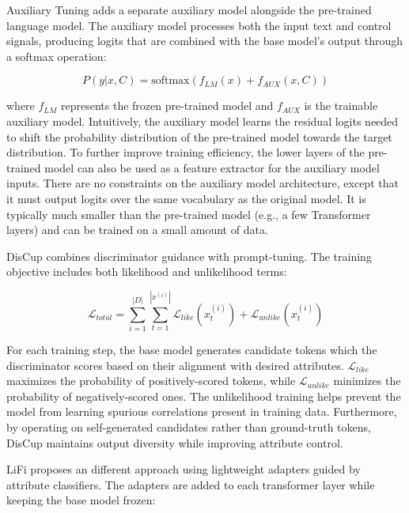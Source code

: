 Auxiliary Tuning \cite{zeldes2020technicalreportauxiliarytuning} adds a separate auxiliary model alongside the pre-trained language model. 
The auxiliary model processes both the input text and control signals, producing logits that are combined with the base model's output through a softmax operation:

\begin{equation}
    P(y|x,C) = \text{softmax}(f_{LM}(x) + f_{AUX}(x,C))
\end{equation}

where $f_{LM}$ represents the frozen pre-trained model and $f_{AUX}$ is the trainable auxiliary model. 
Intuitively, the auxiliary model learns the residual logits needed to shift the probability distribution of the pre-trained model towards the target distribution.
To further improve training efficiency, the lower layers of the pre-trained model can also be used as a feature extractor for the auxiliary model inputs. 
There are no constraints on the auxiliary model architecture, except that it must output logits over the same vocabulary as the original model.
It is typically much smaller than the pre-trained model (e.g., a few Transformer layers) and can be trained on a small amount of data.

DisCup \cite{zhang-song-2022-discup} combines discriminator guidance with prompt-tuning.
The training objective includes both likelihood and unlikelihood terms:

\begin{equation}
    \mathcal{L}_{total} = \sum_{i=1}^{|D|} \sum_{t=1}^{|x^{(i)}|} \mathcal{L}_{like}(x_t^{(i)}) + \mathcal{L}_{unlike}(x_t^{(i)})
\end{equation}

For each training step, the base model generates candidate tokens which the discriminator scores based on their alignment with desired attributes. 
$\mathcal{L}_{like}$ maximizes the probability of positively-scored tokens, while $\mathcal{L}_{unlike}$ minimizes the probability of negatively-scored ones. 
The unlikelihood training helps prevent the model from learning spurious correlations present in training data.
Furthermore, by operating on self-generated candidates rather than ground-truth tokens, DisCup maintains output diversity while improving attribute control.

LiFi \cite{shi2024lifilightweightcontrolledtext} proposes an different approach using lightweight adapters guided by attribute classifiers. The adapters are added to each transformer layer while keeping the base model frozen:

